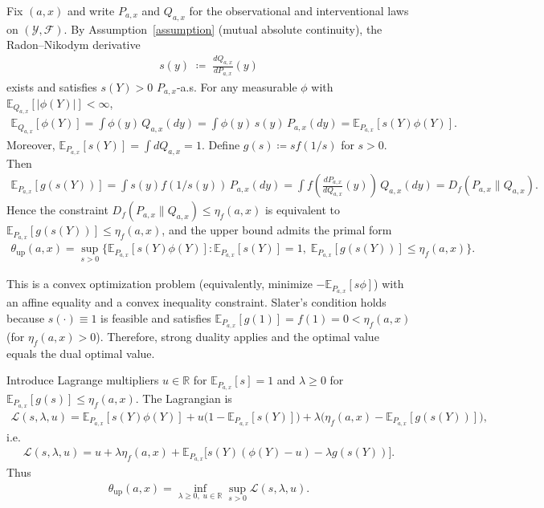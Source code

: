 Fix $(a,x)$ and write $P_{a,x}$ and $Q_{a,x}$ for the observational and interventional laws
on $(\mathcal{Y},\mathcal{F})$. By Assumption~\ref{assumption} (mutual absolute continuity),
the Radon--Nikodym derivative
\begin{align}
s(y) \;\coloneqq\; \frac{dQ_{a,x}}{dP_{a,x}}(y)
\end{align}
exists and satisfies $s(Y)>0$ $P_{a,x}$-a.s. For any measurable $\phi$ with
$\mathbb{E}_{Q_{a,x}}[|\phi(Y)|]<\infty$,
\begin{align}
\mathbb{E}_{Q_{a,x}}[\phi(Y)]
= \int \phi(y)\,Q_{a,x}(dy)
= \int \phi(y)\,s(y)\,P_{a,x}(dy)
= \mathbb{E}_{P_{a,x}}[s(Y)\phi(Y)].
\end{align}
Moreover, $\mathbb{E}_{P_{a,x}}[s(Y)]=\int dQ_{a,x}=1$. Define $g(s)\coloneqq s f(1/s)$
for $s>0$. Then
\begin{align}
\mathbb{E}_{P_{a,x}}[g(s(Y))]
= \int s(y) f(1/s(y))\,P_{a,x}(dy)
= \int f\!\left(\frac{dP_{a,x}}{dQ_{a,x}}(y)\right)\,Q_{a,x}(dy)
= D_f(P_{a,x}\|Q_{a,x}).
\end{align}
Hence the constraint $D_f(P_{a,x}\|Q_{a,x})\le \eta_f(a,x)$ is equivalent to
$\mathbb{E}_{P_{a,x}}[g(s(Y))]\le \eta_f(a,x)$, and the upper bound admits the primal form
\begin{align}
\theta_{\mathrm{up}}(a,x)
= \sup_{s>0}\Big\{ \mathbb{E}_{P_{a,x}}[s(Y)\phi(Y)] :
\mathbb{E}_{P_{a,x}}[s(Y)]=1,\;
\mathbb{E}_{P_{a,x}}[g(s(Y))]\le \eta_f(a,x)\Big\}.
\end{align}

This is a convex optimization problem (equivalently, minimize $-\mathbb{E}_{P_{a,x}}[s\phi]$)
with an affine equality and a convex inequality constraint. Slater's condition holds because
$s(\cdot)\equiv 1$ is feasible and satisfies
$\mathbb{E}_{P_{a,x}}[g(1)]=f(1)=0<\eta_f(a,x)$ (for $\eta_f(a,x)>0$). Therefore, strong
duality applies and the optimal value equals the dual optimal value.

Introduce Lagrange multipliers $u\in\mathbb{R}$ for $\mathbb{E}_{P_{a,x}}[s]=1$ and
$\lambda\ge 0$ for $\mathbb{E}_{P_{a,x}}[g(s)]\le \eta_f(a,x)$. The Lagrangian is
\begin{align}
\mathcal{L}(s,\lambda,u)
= \mathbb{E}_{P_{a,x}}[s(Y)\phi(Y)]
+u\bigl(1-\mathbb{E}_{P_{a,x}}[s(Y)]\bigr)
+\lambda\bigl(\eta_f(a,x)-\mathbb{E}_{P_{a,x}}[g(s(Y))]\bigr),
\end{align}
i.e.
\begin{align}
\mathcal{L}(s,\lambda,u)
= u + \lambda \eta_f(a,x)
+ \mathbb{E}_{P_{a,x}}\!\bigl[s(Y)(\phi(Y)-u) - \lambda g(s(Y))\bigr].
\end{align}
Thus
\begin{align}
\theta_{\mathrm{up}}(a,x)
= \inf_{\lambda\ge 0,\;u\in\mathbb{R}} \sup_{s>0} \mathcal{L}(s,\lambda,u).
\end{align}

